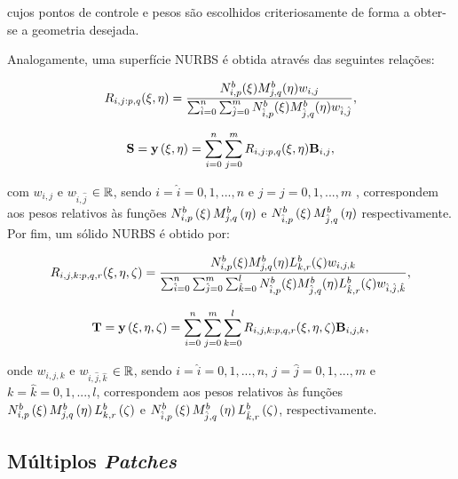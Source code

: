 \documentclass[tese_patricia]{subfiles}
\begin{document}
\noindent cujos pontos de controle e pesos são escolhidos criteriosamente de forma a obter-se a geometria desejada.

Analogamente, uma superfície NURBS é obtida através das seguintes relações:

\begin{align}
R_{i,j:p,q}(\xi,\eta) = \frac{N^b_{i,p}(\xi)M^b_{j,q}(\eta)w_{i,j}}{\sum_{\hat{i}=0}^{n}\sum_{\hat{j}=0}^{m}N^b_{\hat{i},p}(\xi)M^b_{\hat{j},q}(\eta)w_{\hat{i},\hat{j}}},
\end{align}

\begin{align}
\mathbf{S} = \mathbf{y}\left(\xi,\eta\right) = \sum_{i=0}^{n}\sum_{j=0}^{m}R_{i,j:p,q}(\xi,\eta)\mathbf{B}_{i,j}, \label{eq:surfaceNURBS}
\end{align}

\noindent com $w_{i,j}$ e $w_{\hat{i},\hat{j}}$ $\in \mathbb{R}$, sendo $i = \hat{i} =  0, 1, ... , n$ e  $j = \hat{j} =  0, 1, ... , m$ , correspondem aos pesos relativos às funções $N^b_{i,p}\left(\xi\right)M^b_{j,q}\left(\eta\right)$ e $N^b_{\hat{i},p}\left(\xi\right)M^b_{\hat{j},q}\left(\eta\right)$ respectivamente. Por fim, um sólido NURBS é obtido por:

\begin{align}
R_{i,j,k:p,q,r}(\xi,\eta,\zeta) = \frac{N^b_{i,p}(\xi)M^b_{j,q}(\eta)L^b_{k,r}(\zeta)w_{i,j,k}}
{\sum_{\hat{i}=0}^{n}\sum_{\hat{j}=0}^{m}\sum_{\hat{k}=0}^{l}N^b_{\hat{i},p}(\xi)M^b_{\hat{j},q}(\eta)L^b_{\hat{k},r}(\zeta)w_{\hat{i},\hat{j},\hat{k}}},
\end{align}

\begin{align}
\mathbf{T} = \mathbf{y}\left(\xi,\eta,\zeta\right) = \sum_{i=0}^{n}\sum_{j=0}^{m}\sum_{k=0}^{l}R_{i,j,k:p,q,r}(\xi,\eta,\zeta)\mathbf{B}_{i,j,k}, \label{eq:solidNURBS}
\end{align}

\noindent onde $w_{i,j,k}$ e $w_{\hat{i},\hat{j},\hat{k}}$ $\in \mathbb{R}$, sendo $i = \hat{i} =  0, 1, ... , n$, $j = \hat{j} =  0, 1, ... , m$ e $k = \hat{k} =  0, 1, ... , l$, correspondem aos pesos relativos às funções $N^b_{i,p}\left(\xi\right)M^b_{j,q}\left(\eta\right)L^b_{k,r}\left(\zeta\right)$ e $N^b_{\hat{i},p}\left(\xi\right)M^b_{\hat{j},q}\left(\eta\right)L^b_{\hat{k},r}\left(\zeta\right)$, respectivamente.

\subsection{Múltiplos \textit{Patches}}
\end{document}
